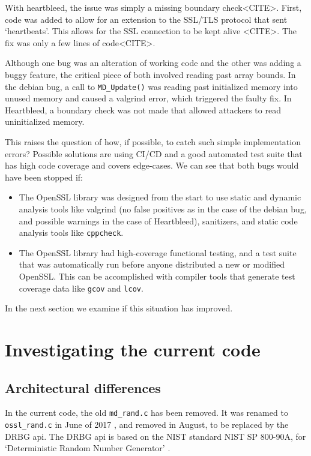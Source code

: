 \documentclass[conference]{IEEEtran}
\begin{document}
With heartbleed, the issue was simply a missing boundary
check<CITE>. First, code was added to allow for an extension to the
SSL/TLS protocol that sent `heartbeats'. This allows for the SSL
connection to be kept alive <CITE>. The fix was only a few lines of
code<CITE>.

Although one bug was an alteration of working code and the other was
adding a buggy feature, the critical piece of both involved reading
past array bounds. In the debian bug, a call to \verb|MD_Update()| was
reading past initialized memory into unused memory and caused a
valgrind error, which triggered the faulty fix. In Heartbleed, a
boundary check was not made that allowed attackers to read
uninitialized memory.

This raises the question of how, if possible, to catch such simple
implementation errors? Possible solutions are using CI/CD and a good
automated test suite that has high code coverage and covers
edge-cases. We can see that both bugs would have been stopped if:

\begin{itemize}
  \item The OpenSSL library was designed from the start to use static
    and dynamic analysis tools like valgrind (no false positives as in
    the case of the debian bug, and possible warnings in the case of
    Heartbleed), sanitizers, and static code analysis tools like \verb|cppcheck|.
  \item The OpenSSL library had high-coverage functional testing, and
    a test suite that was automatically run before anyone distributed
    a new or modified OpenSSL. This can be accomplished with compiler
    tools that generate test coverage data like \verb|gcov| and
    \verb|lcov|.
\end{itemize}

In the next section we examine if this situation has improved.

\section{Investigating the current code}

\subsection{Architectural differences}
In the current code, the old \verb|md_rand.c| has been removed. It was
renamed to \verb|ossl_rand.c| in June of 2017 \cite{13}, and removed
in August, to be replaced by the DRBG api\cite{14}. The DRBG api is
based on the NIST standard NIST SP 800-90A, for `Deterministic Random
Number Generator' \cite{10}\cite{15}.
\end{document}
